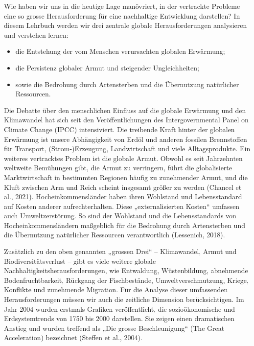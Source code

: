 \documentclass[
  letterpaper,
  DIV=11,
  numbers=noendperiod]{scrartcl}
\begin{document}
Wie haben wir uns in die heutige Lage manövriert, in der vertrackte
Probleme eine so grosse Herausforderung für eine nachhaltige Entwicklung
darstellen? In diesem Lehrbuch werden wir drei zentrale globale
Herausforderungen analysieren und verstehen lernen:

\begin{itemize}
\item
  die Entstehung der vom Menschen verursachten globalen Erwärmung;
\item
  die Persistenz globaler Armut und steigender Ungleichheiten;
\item
  sowie die Bedrohung durch Artensterben und die Übernutzung natürlicher
  Ressourcen.
\end{itemize}

Die Debatte über den menschlichen Einfluss auf die globale Erwärmung und
den Klimawandel hat sich seit den Veröffentlichungen des
Intergovernmental Panel on Climate Change (IPCC) intensiviert. Die
treibende Kraft hinter der globalen Erwärmung ist unsere Abhängigkeit
von Erdöl und anderen fossilen Brennstoffen für Transport,
(Strom-)Erzeugung, Landwirtschaft und viele Alltagsprodukte. Ein
weiteres vertracktes Problem ist die globale Armut. Obwohl es seit
Jahrzehnten weltweite Bemühungen gibt, die Armut zu verringern, führt
die globalisierte Marktwirtschaft in bestimmten Regionen häufig zu
zunehmender Armut, und die Kluft zwischen Arm und Reich scheint
insgesamt größer zu werden (Chancel et al., 2021). Hocheinkommensländer
haben ihren Wohlstand und Lebensstandard auf Kosten anderer
aufrechterhalten. Diese „externalisierten Kosten`` umfassen auch
Umweltzerstörung. So sind der Wohlstand und die Lebensstandards von
Hocheinkommensländern maßgeblich für die Bedrohung durch Artensterben
und die Übernutzung natürlicher Ressourcen verantwortlich (Lessenich,
2018).

Zusätzlich zu den oben genannten „grossen Drei`` -- Klimawandel, Armut
und Biodiversitätsverlust -- gibt es viele weitere globale
Nachhaltigkeitsherausforderungen, wie Entwaldung, Wüstenbildung,
abnehmende Bodenfruchtbarkeit, Rückgang der Fischbestände,
Umweltverschmutzung, Kriege, Konflikte und zunehmende Migration. Für die
Analyse dieser umfassenden Herausforderungen müssen wir auch die
zeitliche Dimension berücksichtigen. Im Jahr 2004 wurden erstmals
Grafiken veröffentlicht, die sozioökonomische und Erdsystemtrends von
1750 bis 2000 darstellen. Sie zeigen einen dramatischen Anstieg und
wurden treffend als „Die grosse Beschleunigung`` (The Great
Acceleration) bezeichnet (Steffen et al., 2004).
\end{document}
